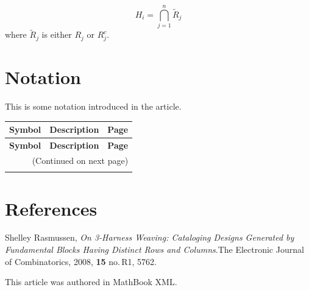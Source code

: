 \documentclass[10pt,]{article}
\theoremstyle{plain}
\begin{document}
\begin{equation*}H_i = \bigcap_{j=1}^{n}{\tilde{R}_j}\end{equation*} 
where \(\tilde{R}_j\) is either \(R_j\)  or \(R_j^c\).
%
%
\appendix
%
\typeout{************************************************}
\typeout{************************************************}
\section[Notation]{Notation}\label{appendix-1}
This is some notation introduced in the article.%
\begin{longtable}[l]{llr}
\textbf{Symbol}&\textbf{Description}&\textbf{Page}\\[1em]
\endfirsthead
\textbf{Symbol}&\textbf{Description}&\textbf{Page}\\[1em]
\endhead
\multicolumn{3}{r}{(Continued on next page)}\\
\endfoot
\endlastfoot
\end{longtable}
\typeout{************************************************}
\typeout{************************************************}
\section*{References}\label{references-1}
\begin{referencelist}
\hypertarget{biblio-rasmussen-harness}{}Shelley Rasmussen, \textit{On 3-Harness Weaving: Cataloging Designs Generated by Fundamental Blocks Having Distinct Rows and Columns}.The Electronic Journal of Combinatorics, 2008, \textbf{15} no.\@\,R1, 57\textendash{}62.
                
\end{referencelist}
%
\printindex
%
This article was authored in MathBook XML.%
\end{document}
